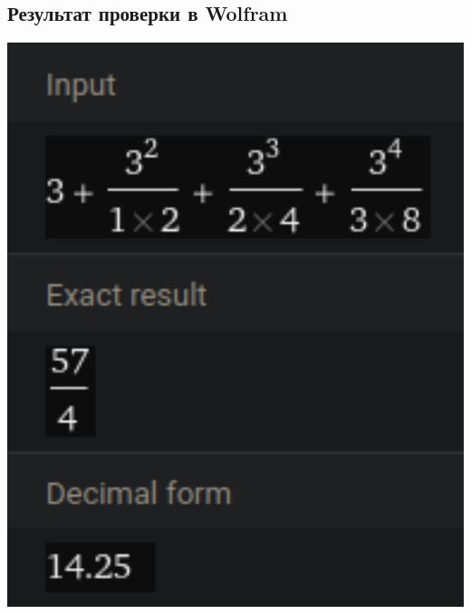 \documentclass[a4paper]{article}
\begin{document}
\subsection{Результат проверки в Wolfram}
\includegraphics[width=1\textwidth]{wa2.png}
\end{document}
